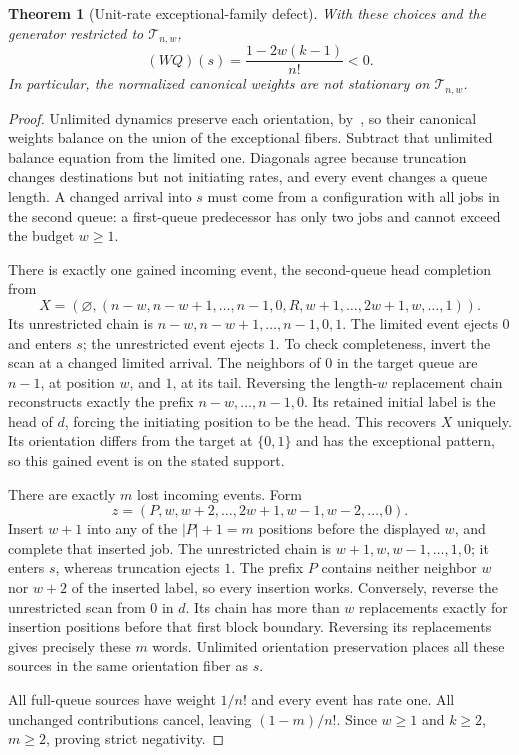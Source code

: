 \documentclass[11pt]{article}
\newtheorem{theorem}{Theorem}
\theoremstyle{remark}
\newcommand{\emptyq}{\varnothing}
\newcommand{\T}{\mathcal T_{n,w}}
\begin{document}
\begin{theorem}[Unit-rate exceptional-family defect]\label{thm:unit}
With these choices and the generator restricted to $\T$,
\begin{equation}\label{eq:unit}
 (WQ)(s)=\frac{1-2w(k-1)}{n!}<0.
\end{equation}
In particular, the normalized canonical weights are not stationary on $\T$.
\end{theorem}
\begin{proof}
Unlimited dynamics preserve each orientation, by~\cite[Lemma~1, p.~217]{DG}, so their canonical weights balance on the union of the exceptional fibers. Subtract that unlimited balance equation from the limited one. Diagonals agree because truncation changes destinations but not initiating rates, and every event changes a queue length. A changed arrival into $s$ must come from a configuration with all jobs in the second queue: a first-queue predecessor has only two jobs and cannot exceed the budget $w\ge1$.

There is exactly one gained incoming event, the second-queue head completion from
\[
 X=(\emptyq,(n-w,n-w+1,\ldots,n-1,0,R,w+1,\ldots,2w+1,w,\ldots,1)).
\]
Its unrestricted chain is $n-w,n-w+1,\ldots,n-1,0,1$. The limited event ejects $0$ and enters $s$; the unrestricted event ejects $1$. To check completeness, invert the scan at a changed limited arrival. The neighbors of $0$ in the target queue are $n-1$, at position $w$, and $1$, at its tail. Reversing the length-$w$ replacement chain reconstructs exactly the prefix $n-w,\ldots,n-1,0$. Its retained initial label is the head of $d$, forcing the initiating position to be the head. This recovers $X$ uniquely. Its orientation differs from the target at $\{0,1\}$ and has the exceptional pattern, so this gained event is on the stated support.

There are exactly $m$ lost incoming events. Form
\[
 z=(P,w,w+2,\ldots,2w+1,w-1,w-2,\ldots,0).
\]
Insert $w+1$ into any of the $|P|+1=m$ positions before the displayed $w$, and complete that inserted job. The unrestricted chain is $w+1,w,w-1,\ldots,1,0$; it enters $s$, whereas truncation ejects $1$. The prefix $P$ contains neither neighbor $w$ nor $w+2$ of the inserted label, so every insertion works. Conversely, reverse the unrestricted scan from $0$ in $d$. Its chain has more than $w$ replacements exactly for insertion positions before that first block boundary. Reversing its replacements gives precisely these $m$ words. Unlimited orientation preservation places all these sources in the same orientation fiber as $s$.

All full-queue sources have weight $1/n!$ and every event has rate one. All unchanged contributions cancel, leaving $(1-m)/n!$. Since $w\ge1$ and $k\ge2$, $m\ge2$, proving strict negativity.
\end{proof}
\end{document}
